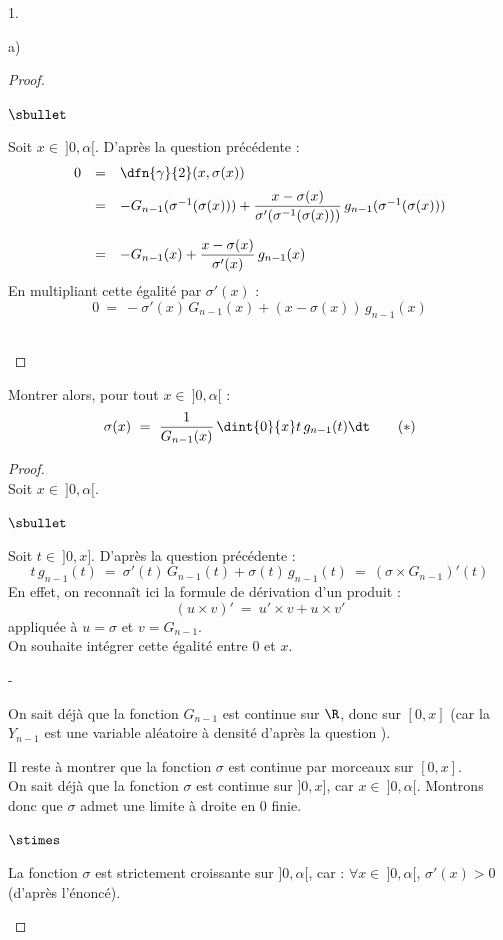 \documentclass[11pt]{article}%
\begin{document}
\begin{noliste}{1.}
\begin{noliste}{a)}
\begin{proof}
\begin{noliste}{$\sbullet$}
	
	\item Soit $x \in \ ]0,\alpha[$. D'après la question 
	précédente :
	\[
	  \begin{array}{rcl}
	    0 & = & \dfn{\gamma}{2}(x, \sigma(x))
	    \\[.2cm]
	    & = & - G_{n-1}(\sigma^{-1}(\sigma(x))) + 
	    \dfrac{x - \sigma(x)}{\sigma'(\sigma^{-1}(\sigma(x)))}
	    \, g_{n-1}(\sigma^{-1}(\sigma(x)))
	    \\[.6cm]
	    & = & -G_{n-1}(x) + \dfrac{x - \sigma(x)}{\sigma'(x)}
	    \, g_{n-1}(x)
	  \end{array}
	\]
	En multipliant cette égalité par $\sigma'(x)$ :
	\[
	  0 \ = \ -\sigma'(x) \, G_{n-1}(x) + (x-\sigma(x)) \, 
	  g_{n-1}(x)
	\]
	\conc{D'où : $\forall x \in \ ]0,\alpha[$, $\sigma'(x) \,
	G_{n-1}(x) + \sigma(x) \, g_{n-1}(x) \ = \ x \, 
	g_{n-1}(x)$.}~\\[-1.4cm]
      \end{noliste}
    \end{proof}

    
    \item Montrer alors, pour tout $x \in \ ]0,\alpha[$ : 
    \[
      \sigma(x) \ = \ \dfrac{1}{G_{n-1}(x)} \, \dint{0}{x} t \, 
      g_{n-1}(t) \dt \qquad (*)
    \]
    
    \begin{proof}~\\
      Soit $x \in \ ]0,\alpha[$. 
      \begin{noliste}{$\sbullet$}
	\item Soit $t \in \ ]0,x]$.
	D'après la question précédente :
	\[
	  t \, g_{n-1}(t) \ = \ \sigma'(t) \, G_{n-1}(t) + \sigma(t) \,
	  g_{n-1}(t) \ = \ (\sigma \times G_{n-1})'(t)
	\]
	En effet, on reconnaît ici la formule de dérivation d'un 
	produit :
        \[
          (u \times v)' \ = \ u' \times v + u \times v'
        \]
        appliquée à $u = \sigma$ et $v = G_{n-1}$.\\[.1cm]
	On souhaite intégrer cette égalité entre $0$ et $x$.
	\begin{noliste}{-}
	  \item On sait déjà que la fonction $G_{n-1}$ est continue 
	  sur $\R$, donc sur $[0,x]$ (car la \var $Y_{n-1}$ est une 
	  variable aléatoire à densité d'après la question ).
	  
	  \item Il reste à montrer que la fonction $\sigma$ est 
	  continue par morceaux sur $[0,x]$.\\
	  On sait déjà que la fonction $\sigma$ est continue sur 
	  $]0,x]$, car $x \in \ ]0,\alpha[$. Montrons donc que $\sigma$
	  admet une limite à droite en $0$ finie.
	\end{noliste}
	\begin{liste}{$\stimes$}
	  \item La fonction $\sigma$ est strictement croissante sur 
	  $]0,\alpha[$, car : $\forall x \in \ ]0,\alpha[$, 
	  $\sigma'(x) >0$ (d'après l'énoncé).
	  

\end{liste}
\end{noliste}
\end{proof}
\end{noliste}
\end{noliste}
\end{document}
